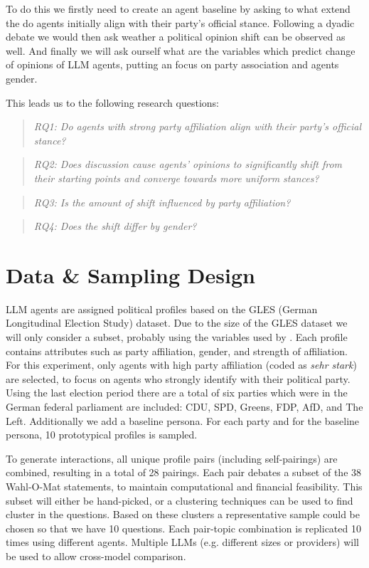 \documentclass[12pt]{article}
\newcommand{\researchquestion}[1]{\begin{quote}\sloppy \emph{#1} \end{quote}}
\begin{document}
\begin{multicols}{2}
To do this we firstly need to create an agent baseline by asking to what extend the do agents initially align with their party's official stance. Following a dyadic debate we would then ask weather a political opinion shift can be observed as well. And finally we will ask ourself what are the variables which predict change of opinions of LLM agents, putting an focus on party association and agents gender. 

This leads us to the following research questions:
\researchquestion{RQ1: Do agents with strong party affiliation align with their party’s official stance?}
\researchquestion{RQ2: Does discussion cause agents' opinions to significantly shift from their starting points and converge towards more uniform stances?}
\researchquestion{RQ3: Is the amount of shift influenced by party affiliation?}
\researchquestion{RQ4: Does the shift differ by gender?}


\section{Data \& Sampling Design}

LLM agents are assigned political profiles based on the GLES (German Longitudinal Election Study) dataset. Due to the size of the GLES dataset we will only consider a subset, probably using the variables used by . Each profile contains attributes such as party affiliation, gender, and strength of affiliation. For this experiment, only agents with high party affiliation (coded as \textit{sehr stark}) are selected, to focus on agents who strongly identify with their political party. Using the last election period there are a total of six parties which were in the German federal parliament are included: CDU, SPD, Greens, FDP, AfD, and The Left. Additionally we add a baseline persona. For each party and for the baseline persona, 10 prototypical profiles is sampled. 

To generate interactions, all unique profile pairs (including self-pairings) are combined, resulting in a total of 28 pairings. Each pair debates a subset of the 38 Wahl-O-Mat statements, to maintain computational and financial feasibility. This subset will either be hand-picked, or a clustering techniques can be used to find cluster in the questions. Based on these clusters a representative sample could be chosen so that we have 10 questions. Each pair-topic combination is replicated 10 times using different agents. Multiple LLMs (e.g. different sizes or providers) will be used to allow cross-model comparison.

\end{multicols}
\end{document}
